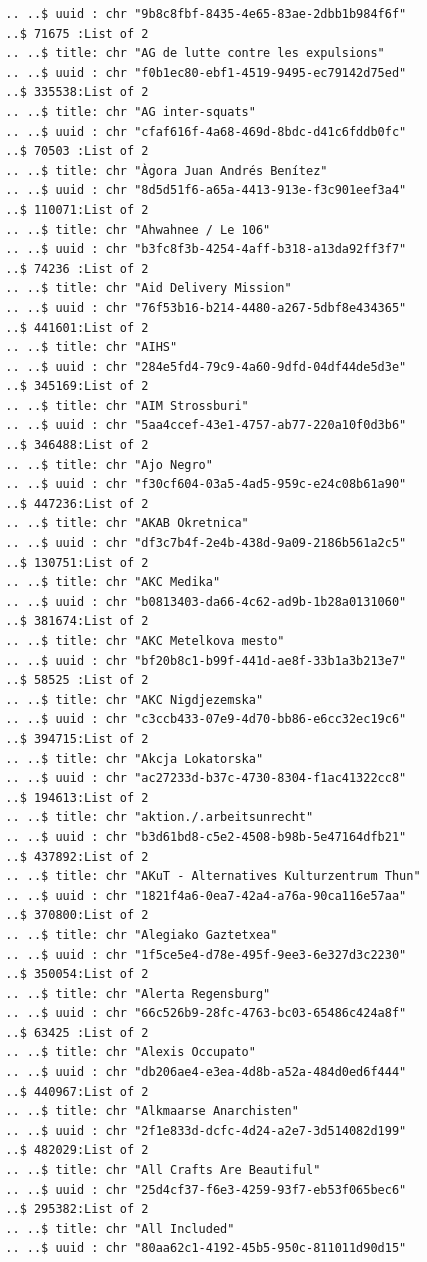 \documentclass[
  letterpaper,
  DIV=11,
  numbers=noendperiod]{scrartcl}
\begin{document}
\begin{verbatim}
  .. ..$ uuid : chr "9b8c8fbf-8435-4e65-83ae-2dbb1b984f6f"
  ..$ 71675 :List of 2
  .. ..$ title: chr "AG de lutte contre les expulsions"
  .. ..$ uuid : chr "f0b1ec80-ebf1-4519-9495-ec79142d75ed"
  ..$ 335538:List of 2
  .. ..$ title: chr "AG inter-squats"
  .. ..$ uuid : chr "cfaf616f-4a68-469d-8bdc-d41c6fddb0fc"
  ..$ 70503 :List of 2
  .. ..$ title: chr "Àgora Juan Andrés Benítez"
  .. ..$ uuid : chr "8d5d51f6-a65a-4413-913e-f3c901eef3a4"
  ..$ 110071:List of 2
  .. ..$ title: chr "Ahwahnee / Le 106"
  .. ..$ uuid : chr "b3fc8f3b-4254-4aff-b318-a13da92ff3f7"
  ..$ 74236 :List of 2
  .. ..$ title: chr "Aid Delivery Mission"
  .. ..$ uuid : chr "76f53b16-b214-4480-a267-5dbf8e434365"
  ..$ 441601:List of 2
  .. ..$ title: chr "AIHS"
  .. ..$ uuid : chr "284e5fd4-79c9-4a60-9dfd-04df44de5d3e"
  ..$ 345169:List of 2
  .. ..$ title: chr "AIM Strossburi"
  .. ..$ uuid : chr "5aa4ccef-43e1-4757-ab77-220a10f0d3b6"
  ..$ 346488:List of 2
  .. ..$ title: chr "Ajo Negro"
  .. ..$ uuid : chr "f30cf604-03a5-4ad5-959c-e24c08b61a90"
  ..$ 447236:List of 2
  .. ..$ title: chr "AKAB Okretnica"
  .. ..$ uuid : chr "df3c7b4f-2e4b-438d-9a09-2186b561a2c5"
  ..$ 130751:List of 2
  .. ..$ title: chr "AKC Medika"
  .. ..$ uuid : chr "b0813403-da66-4c62-ad9b-1b28a0131060"
  ..$ 381674:List of 2
  .. ..$ title: chr "AKC Metelkova mesto"
  .. ..$ uuid : chr "bf20b8c1-b99f-441d-ae8f-33b1a3b213e7"
  ..$ 58525 :List of 2
  .. ..$ title: chr "AKC Nigdjezemska"
  .. ..$ uuid : chr "c3ccb433-07e9-4d70-bb86-e6cc32ec19c6"
  ..$ 394715:List of 2
  .. ..$ title: chr "Akcja Lokatorska"
  .. ..$ uuid : chr "ac27233d-b37c-4730-8304-f1ac41322cc8"
  ..$ 194613:List of 2
  .. ..$ title: chr "aktion./.arbeitsunrecht"
  .. ..$ uuid : chr "b3d61bd8-c5e2-4508-b98b-5e47164dfb21"
  ..$ 437892:List of 2
  .. ..$ title: chr "AKuT - Alternatives Kulturzentrum Thun"
  .. ..$ uuid : chr "1821f4a6-0ea7-42a4-a76a-90ca116e57aa"
  ..$ 370800:List of 2
  .. ..$ title: chr "Alegiako Gaztetxea"
  .. ..$ uuid : chr "1f5ce5e4-d78e-495f-9ee3-6e327d3c2230"
  ..$ 350054:List of 2
  .. ..$ title: chr "Alerta Regensburg"
  .. ..$ uuid : chr "66c526b9-28fc-4763-bc03-65486c424a8f"
  ..$ 63425 :List of 2
  .. ..$ title: chr "Alexis Occupato"
  .. ..$ uuid : chr "db206ae4-e3ea-4d8b-a52a-484d0ed6f444"
  ..$ 440967:List of 2
  .. ..$ title: chr "Alkmaarse Anarchisten"
  .. ..$ uuid : chr "2f1e833d-dcfc-4d24-a2e7-3d514082d199"
  ..$ 482029:List of 2
  .. ..$ title: chr "All Crafts Are Beautiful"
  .. ..$ uuid : chr "25d4cf37-f6e3-4259-93f7-eb53f065bec6"
  ..$ 295382:List of 2
  .. ..$ title: chr "All Included"
  .. ..$ uuid : chr "80aa62c1-4192-45b5-950c-811011d90d15"

\end{verbatim}
\end{document}
